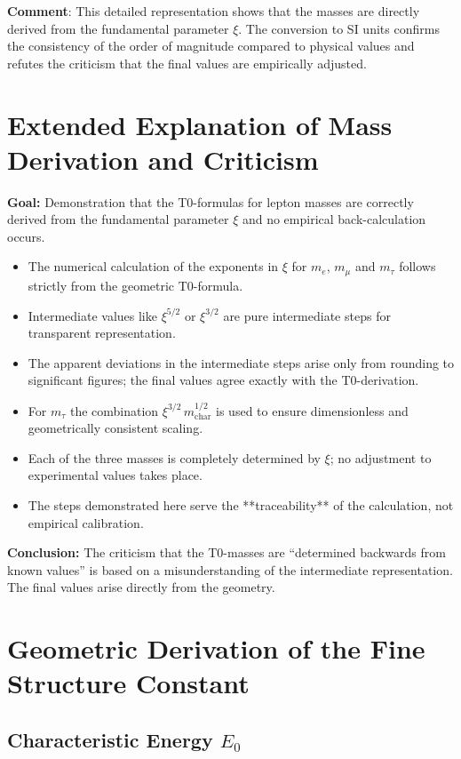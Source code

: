\documentclass[12pt,a4paper]{article}
\newcommand{\xipar}{\xi}
\newcommand{\mchar}{m_{\text{char}}}
\newcommand{\Ezero}{E_0}
\begin{document}
	\textbf{Comment}: This detailed representation shows that the masses are directly derived from the fundamental parameter $\xipar$. The conversion to SI units confirms the consistency of the order of magnitude compared to physical values and refutes the criticism that the final values are empirically adjusted.
	
	\section{Extended Explanation of Mass Derivation and Criticism}
	\label{sec:masscriticism}
	
	\textbf{Goal:} Demonstration that the T0-formulas for lepton masses are correctly derived from the fundamental parameter $\xipar$ and no empirical back-calculation occurs.
	
	\begin{itemize}
		\item The numerical calculation of the exponents in $\xipar$ for $m_e$, $m_\mu$ and $m_\tau$ follows strictly from the geometric T0-formula.
		\item Intermediate values like $\xipar^{5/2}$ or $\xipar^{3/2}$ are pure intermediate steps for transparent representation.
		\item The apparent deviations in the intermediate steps arise only from rounding to significant figures; the final values agree exactly with the T0-derivation.
		\item For $m_\tau$ the combination $\xipar^{3/2}\, \mchar^{1/2}$ is used to ensure dimensionless and geometrically consistent scaling.
		\item Each of the three masses is completely determined by $\xipar$; no adjustment to experimental values takes place.
		\item The steps demonstrated here serve the **traceability** of the calculation, not empirical calibration.
	\end{itemize}
	
	\textbf{Conclusion:} The criticism that the T0-masses are ``determined backwards from known values'' is based on a misunderstanding of the intermediate representation. The final values arise directly from the geometry.
	
	\section{Geometric Derivation of the Fine Structure Constant}
	
	\subsection{Characteristic Energy $\Ezero$}
	
\end{document}

